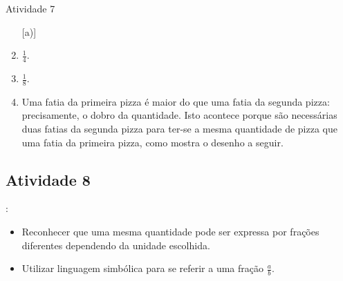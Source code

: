 \begin{multicols}{2}
\begin{resposta*}{Atividade 7}
\begin{enumerate} [\quad a)] %
    \item             $\frac{1}{4}$.
    \item             $\frac{1}{8}$.
    \item       Uma fatia da primeira pizza é maior do que uma fatia da segunda pizza: precisamente, o dobro da quantidade. Isto acontece porque são necessárias duas fatias da segunda pizza para ter-se a mesma quantidade de pizza que uma fatia da primeira pizza, como mostra o desenho a seguir.
\end{enumerate} %
\begin{center}
        \quad \quad
\end{center}
\end{resposta*}





\subsection{Atividade 8}


   \vspace{.1cm}:

  \begin{itemize} %
    \item       Reconhecer que uma mesma quantidade pode ser expressa por frações diferentes dependendo da unidade escolhida.
    \item       Utilizar linguagem simbólica para se referir a uma fração       $\frac{a}{b}$.
\end{itemize} %


  \vspace{.1cm}


\end{multicols}
